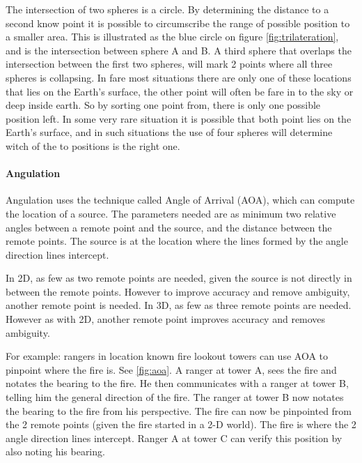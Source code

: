   The intersection of two spheres is a circle. By determining the distance to a second know point it is possible to circumscribe the range of possible position to a smaller area.
  This is illustrated as the blue circle on figure \ref{fig:trilateration}, and is the intersection between sphere A and B.
  A third sphere that overlaps the intersection between the first two spheres, will mark 2 points where all three spheres is collapsing. In fare most situations there are only one of these locations that lies on the Earth's surface, the other point will often be fare in to the sky or deep inside earth. So by sorting one point from, there is only one possible position left. 
  In some very rare situation it is possible that both point lies on the Earth's surface, and in such situations the use of four spheres will determine witch of the to positions is the right one.



  \paragraph{Angulation}

  Angulation uses the technique called Angle of Arrival (AOA), which can compute the location of a source. The parameters needed are as minimum two relative angles between a remote point and the source, and the distance between the remote points. The source is at the location where the lines formed by the angle direction lines intercept. 

  In 2D, as few as two remote points are needed, given the source is not directly in between the remote points. However to improve accuracy and remove ambiguity, another remote point is needed. In 3D, as few as three remote points are needed. However as with 2D, another remote point improves accuracy and removes ambiguity. \cite{survey_pos, Sun2009, Boontrai2009}

  For example: rangers in location known fire lookout towers can use AOA to pinpoint where the fire is. See \cref{fig:aoa}. A ranger at tower A, sees the fire and notates the bearing to the fire. He then communicates with a ranger at tower B, telling him the general direction of the fire. The ranger at tower B now notates the bearing to the fire from his perspective. The fire can now be pinpointed from the 2 remote points (given the fire started in a 2-D world). The fire is where the 2 angle direction lines intercept. Ranger A at tower C can verify this position by also noting his bearing. \cite{compassdude_triangulation}

